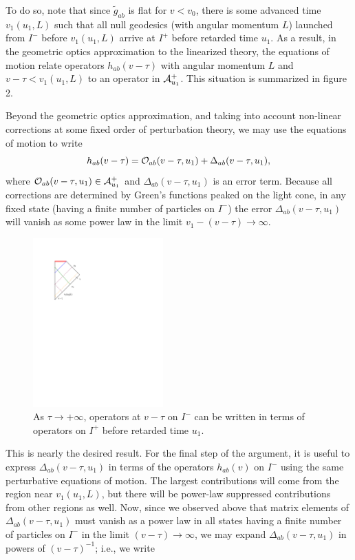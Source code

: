 \documentclass[12pt,onecolumn,eqsecnum,aps,prd,nofootinbib]{revtex4}
\def\be{\begin{equation}}
\def\ee{\end{equation}}
\begin{document}
To do so, note that since $\tilde g_{ab}$ is flat for $v < v_0$,
there is some advanced time $v_1(u_1,L)$ such that all null
geodesics (with angular momentum $L$) launched from $I^-$ before
$v_1(u_1,L)$ arrive at $I^+$ before retarded time $u_1$.  As a
result, in the geometric optics approximation to the linearized
theory, the equations of motion relate operators $h_{ab}(v-\tau)$
with angular momentum $L$ and $v - \tau < v_1(u_1,L)$ to an operator
in ${\cal A}^+_{u_1}$. This situation is summarized in figure 2.

Beyond the geometric optics approximation,
and taking into account non-linear corrections at some fixed order
of perturbation theory, we may use the equations of motion to write
 \be
  h_{ab}(v-\tau) =  {\cal O}_{ab}(v-\tau, u_1) + \Delta_{ab}(v-\tau,
  u_1),
   \ee
where ${\cal O}_{ab}(v-\tau, u_1) \in {\cal A}^+_{u_1}$ and
$\Delta_{ab}(v-\tau,u_1)$ is an error term.  Because all corrections
are determined by Green's functions peaked on the light cone, in any
fixed state (having a finite number of particles on $I^-$) the error
$\Delta_{ab}(v-\tau,u_1)$ will vanish as some power law in the limit $v_1 - (v - \tau) \rightarrow \infty$.

\begin{figure}
 \includegraphics[width=5cm] {translate.pdf}
 \caption{As $\tau \rightarrow +\infty$, operators at $v-\tau$ on $I^-$
 can be written in terms of operators on $I^+$ before retarded time $u_1$.}
 \label{translate}
 \end{figure}


This is nearly the desired result.  For the final step of the argument, it is useful to express $\Delta_{ab}(v-\tau,u_1)$ in terms of the operators $h_{ab}(v)$ on $I^-$ using the same perturbative equations of motion.
The largest contributions will come from the region near $v_1(u_1,L)$, but there will be power-law suppressed contributions from other regions as well.  Now, since we observed above that matrix elements of $\Delta_{ab}(v-\tau,u_1)$ must vanish as a power law in all states having a finite number of particles on $I^-$ in the limit $(v-\tau) \rightarrow \infty$, we may expand $\Delta_{ab}(v-\tau,u_1)$ in powers of $(v-\tau)^{-1}$; i.e., we write
\end{document}
